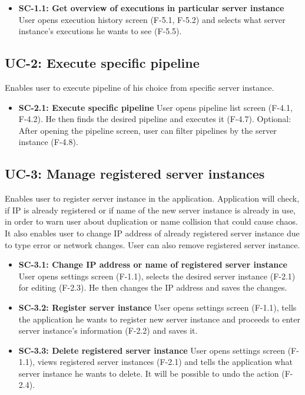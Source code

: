 \begin{itemize}
\item \textbf{SC-1.1: Get overview of executions in particular server instance}
User opens execution history screen (F-5.1, F-5.2) and selects what server instance's executions he wants to see (F-5.5).

\end{itemize}

\subsection*{UC-2: Execute specific pipeline}
Enables user to execute pipeline of his choice from specific server instance.

\begin{itemize}
\item \textbf{SC-2.1: Execute specific pipeline}
User opens pipeline list screen (F-4.1, F-4.2). He then finds the desired pipeline and executes it (F-4.7). Optional: After opening the pipeline screen, user can filter pipelines by the server instance (F-4.8).

\end{itemize}

\subsection*{UC-3: Manage registered server instances}
Enables user to register server instance in the application. Application will check, if IP is already registered or if name of the new server instance is already in use, in order to warn user about duplication or name collision that could cause chaos. It also enables user to change IP address of already registered server instance due to type error or network changes. User can also remove registered server instance.

\begin{itemize}
\item \textbf{SC-3.1: Change IP address or name of registered server instance}
User opens settings screen (F-1.1), selects the desired server instance (F-2.1) for editing (F-2.3). He then changes the IP address and saves the changes.

\item \textbf{SC-3.2: Register server instance}
User opens settings screen (F-1.1), tells the application he wants to register new server instance and proceeds to enter server instance's information (F-2.2) and saves it.

\item \textbf{SC-3.3: Delete registered server instance}
User opens settings screen (F-1.1), views registered server instances (F-2.1) and tells the application what server instance he wants to delete. It will be possible to undo the action (F-2.4).

\end{itemize}

